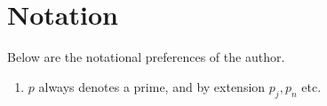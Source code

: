\section*{Notation}
Below are the notational preferences of the author.
\begin{enumerate}
    \item $p$ always denotes a prime, and by extension $p_j,p_n$ etc.
\end{enumerate}
